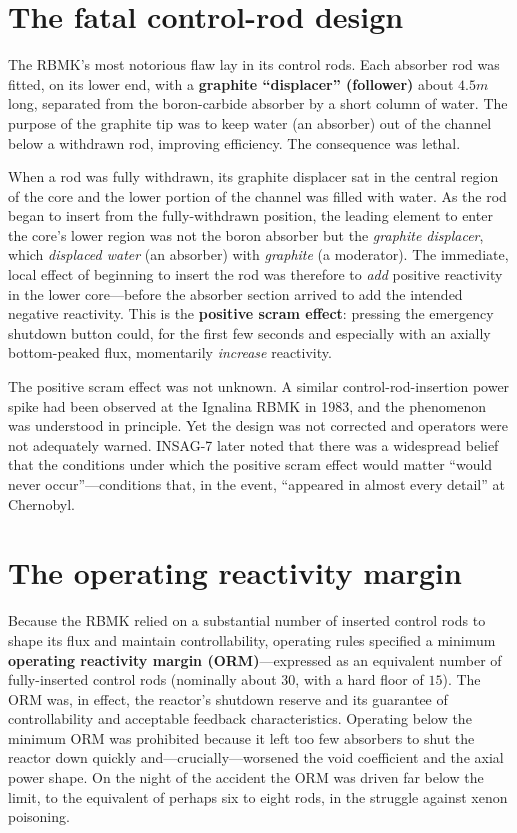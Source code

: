 \section{The fatal control-rod design}

The RBMK's most notorious flaw lay in its control rods. Each absorber rod was
fitted, on its lower end, with a \textbf{graphite ``displacer'' (follower)} about
$4.5\unit{m}$ long, separated from the boron-carbide absorber by a short column of
water. The purpose of the graphite tip was to keep water (an absorber) out of the
channel below a withdrawn rod, improving efficiency. The consequence was lethal.

When a rod was fully withdrawn, its graphite displacer sat in the central region
of the core and the lower portion of the channel was filled with water. As the rod
began to insert from the fully-withdrawn position, the leading element to enter the
core's lower region was not the boron absorber but the \emph{graphite displacer},
which \emph{displaced water} (an absorber) with \emph{graphite} (a moderator). The
immediate, local effect of beginning to insert the rod was therefore to
\emph{add} positive reactivity in the lower core---before the absorber section
arrived to add the intended negative reactivity. This is the \textbf{positive
scram effect}: pressing the emergency shutdown button could, for the first few
seconds and especially with an axially bottom-peaked flux, momentarily
\emph{increase} reactivity.

\begin{remark}
The positive scram effect was not unknown. A similar control-rod-insertion power
spike had been observed at the Ignalina RBMK in 1983, and the phenomenon was
understood in principle. Yet the design was not corrected and operators were not
adequately warned. INSAG-7 later noted that there was a widespread belief that the
conditions under which the positive scram effect would matter ``would never
occur''---conditions that, in the event, ``appeared in almost every detail'' at
Chernobyl.
\end{remark}

\section{The operating reactivity margin}

Because the RBMK relied on a substantial number of inserted control rods to shape
its flux and maintain controllability, operating rules specified a minimum
\textbf{operating reactivity margin (ORM)}---expressed as an equivalent number of
fully-inserted control rods (nominally about $30$, with a hard floor of $15$). The
ORM was, in effect, the reactor's shutdown reserve and its guarantee of
controllability and acceptable feedback characteristics. Operating below the
minimum ORM was prohibited because it left too few absorbers to shut the reactor
down quickly and---crucially---worsened the void coefficient and the axial power
shape. On the night of the accident the ORM was driven far below the limit, to the
equivalent of perhaps six to eight rods, in the struggle against xenon poisoning.

